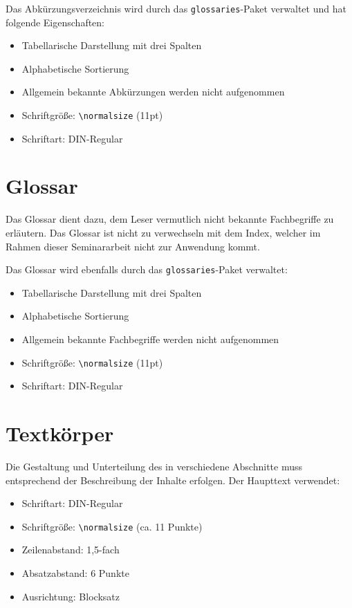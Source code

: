 Das Abkürzungsverzeichnis wird durch das \texttt{glossaries}-Paket verwaltet und hat folgende Eigenschaften:
\begin{itemize}
	\item Tabellarische Darstellung mit drei Spalten
	\item Alphabetische Sortierung
	\item Allgemein bekannte Abkürzungen werden nicht aufgenommen
	\item Schriftgröße: \texttt{\textbackslash normalsize} (11pt)
	\item Schriftart: DIN-Regular
\end{itemize}

\section{Glossar}
\label{sec:glossar}

Das Glossar dient dazu, dem Leser vermutlich nicht bekannte Fachbegriffe zu erläutern. Das Glossar ist nicht zu verwechseln mit dem Index, welcher im Rahmen dieser Seminararbeit nicht zur Anwendung kommt.

Das Glossar wird ebenfalls durch das \texttt{glossaries}-Paket verwaltet:
\begin{itemize}
	\item Tabellarische Darstellung mit drei Spalten
	\item Alphabetische Sortierung
	\item Allgemein bekannte Fachbegriffe werden nicht aufgenommen
	\item Schriftgröße: \texttt{\textbackslash normalsize} (11pt)
	\item Schriftart: DIN-Regular
\end{itemize}

\section{Textkörper}
\label{sec:textkoerper}

Die Gestaltung und Unterteilung des  in verschiedene Abschnitte muss entsprechend der Beschreibung der Inhalte erfolgen. Der Haupttext verwendet:
\begin{itemize}
	\item Schriftart: DIN-Regular
	\item Schriftgröße: \texttt{\textbackslash normalsize} (ca. 11 Punkte)
	\item Zeilenabstand: 1,5-fach
	\item Absatzabstand: 6 Punkte
	\item Ausrichtung: Blocksatz
\end{itemize}

